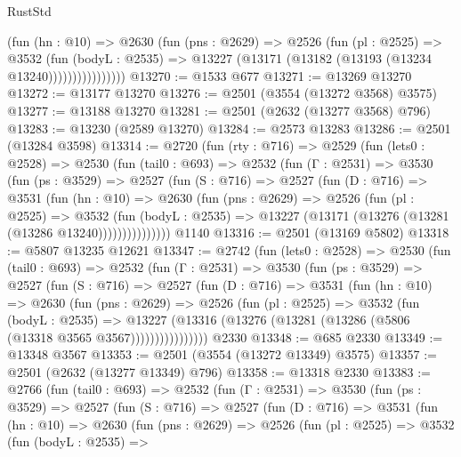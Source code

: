 \begin{lexlean}{RustStd}
\begin{coremodule}
{\begin{coremodule}
{{{{{{{{{{{{{{{{{{{{                    (fun (hn : @10) =>
                    @2630
                      (fun (pns : @2629) =>
                      @2526
                        (fun (pl : @2525) =>
                        @3532
                          (fun (bodyL : @2535) =>
                          @13227 (@13171 (@13182 (@13193 (@13234 @13240))))))))))))))))
@13270 := @1533 @677
@13271 := @13269 @13270
@13272 := @13177 @13270
@13276 := @2501 (@3554 (@13272 @3568) @3575)
@13277 := @13188 @13270
@13281 := @2501 (@2632 (@13277 @3568) @796)
@13283 := @13230 (@2589 @13270)
@13284 := @2573 @13283
@13286 := @2501 (@13284 @3598)
@13314 := @2720
    (fun (rty : @716) =>
    @2529
      (fun (lets0 : @2528) =>
      @2530
        (fun (tail0 : @693) =>
        @2532
          (fun (Γ : @2531) =>
          @3530
            (fun (ps : @3529) =>
            @2527
              (fun (S : @716) =>
              @2527
                (fun (D : @716) =>
                @3531
                  (fun (hn : @10) =>
                  @2630
                    (fun (pns : @2629) =>
                    @2526
                      (fun (pl : @2525) =>
                      @3532
                        (fun (bodyL : @2535) =>
                        @13227 (@13171 (@13276 (@13281 (@13286 @13240)))))))))))))))
    @1140
@13316 := @2501 (@13169 @5802)
@13318 := @5807 @13235 @12621
@13347 := @2742
    (fun (lets0 : @2528) =>
    @2530
      (fun (tail0 : @693) =>
      @2532
        (fun (Γ : @2531) =>
        @3530
          (fun (ps : @3529) =>
          @2527
            (fun (S : @716) =>
            @2527
              (fun (D : @716) =>
              @3531
                (fun (hn : @10) =>
                @2630
                  (fun (pns : @2629) =>
                  @2526
                    (fun (pl : @2525) =>
                    @3532
                      (fun (bodyL : @2535) =>
                      @13227
                        (@13316 (@13276 (@13281 (@13286 (@5806 (@13318 @3565 @3567))))))))))))))))
    @2330
@13348 := @685 @2330
@13349 := @13348 @3567
@13353 := @2501 (@3554 (@13272 @13349) @3575)
@13357 := @2501 (@2632 (@13277 @13349) @796)
@13358 := @13318 @2330
@13383 := @2766
    (fun (tail0 : @693) =>
    @2532
      (fun (Γ : @2531) =>
      @3530
        (fun (ps : @3529) =>
        @2527
          (fun (S : @716) =>
          @2527
            (fun (D : @716) =>
            @3531
              (fun (hn : @10) =>
              @2630
                (fun (pns : @2629) =>
                @2526
                  (fun (pl : @2525) =>
                  @3532
                    (fun (bodyL : @2535) =>
}}}}}}}}}}}}}}}}}}}}
\end{coremodule}}
\end{coremodule}
\end{lexlean}
